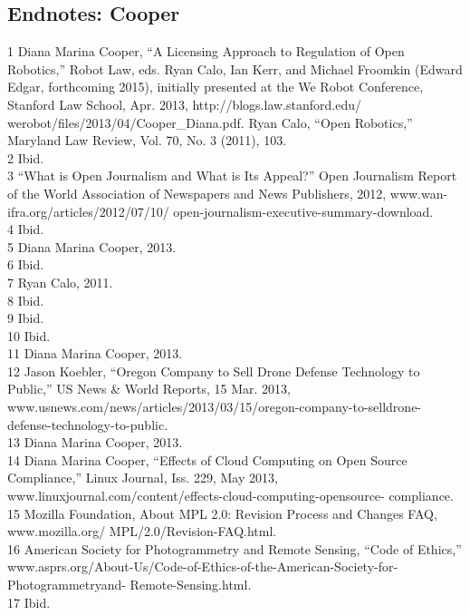 \begin{itemize}
\begin{itemized}
\begin{itemize}
\section{Endnotes: Cooper}
1 Diana Marina Cooper, ``A Licensing Approach to Regulation of Open Robotics,'' Robot Law, eds.
Ryan Calo, Ian Kerr, and Michael Froomkin (Edward Edgar, forthcoming 2015), initially presented
at the We Robot Conference, Stanford Law School, Apr. 2013, http://blogs.law.stanford.edu/
werobot/files/2013/04/Cooper_Diana.pdf. Ryan Calo, ``Open Robotics,'' Maryland Law Review,
Vol. 70, No. 3 (2011), 103.\\
2 Ibid.\\
3 ``What is Open Journalism and What is Its Appeal?'' Open Journalism Report of the World
Association of Newspapers and News Publishers, 2012, www.wan-ifra.org/articles/2012/07/10/
open-journalism-executive-summary-download.\\
4 Ibid.\\
5 Diana Marina Cooper, 2013.\\
6 Ibid.\\
7 Ryan Calo, 2011.\\
8 Ibid.\\
9 Ibid.\\
10 Ibid.\\
11 Diana Marina Cooper, 2013.\\
12 Jason Koebler, ``Oregon Company to Sell Drone Defense Technology to Public,'' US News & World
Reports, 15 Mar. 2013, www.usnews.com/news/articles/2013/03/15/oregon-company-to-selldrone-
defense-technology-to-public.\\
13 Diana Marina Cooper, 2013.\\
14 Diana Marina Cooper, ``Effects of Cloud Computing on Open Source Compliance,'' Linux
Journal, Iss. 229, May 2013, www.linuxjournal.com/content/effects-cloud-computing-opensource-
compliance.\\
15 Mozilla Foundation, About MPL 2.0: Revision Process and Changes FAQ, www.mozilla.org/
MPL/2.0/Revision-FAQ.html.\\
16 American Society for Photogrammetry and Remote Sensing, ``Code of Ethics,''
www.asprs.org/About-Us/Code-of-Ethics-of-the-American-Society-for-Photogrammetryand-
Remote-Sensing.html.\\
17 Ibid.\\


\end{itemize}
\end{itemized}
\end{itemize}
